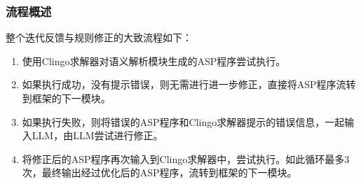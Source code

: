 \subsubsection{流程概述}
整个迭代反馈与规则修正的大致流程如下：
\begin{enumerate}[itemsep=0pt,parsep=0pt]
\item 使用Clingo求解器对语义解析模块生成的ASP程序尝试执行。
\item 如果执行成功，没有提示错误，则无需进行进一步修正，直接将ASP程序流转到框架的下一模块。
\item 如果执行失败，则将错误的ASP程序和Clingo求解器提示的错误信息，一起输入LLM，由LLM尝试进行修正。
\item 将修正后的ASP程序再次输入到Clingo求解器中，尝试执行。如此循环最多3次，最终输出经过优化后的ASP程序，流转到框架的下一模块。
\end{enumerate}
